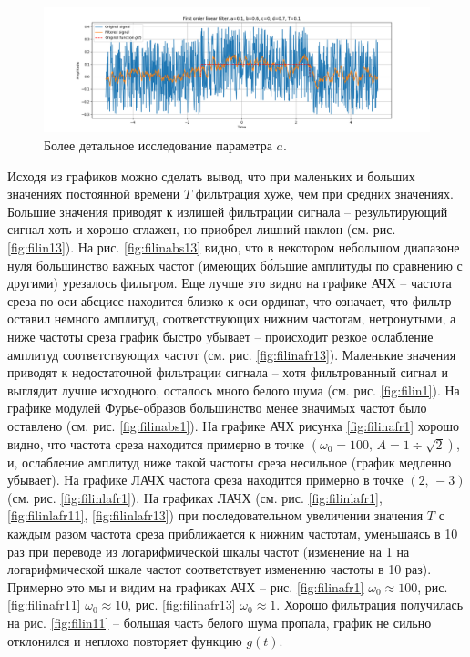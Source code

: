 \documentclass[a4paper, 12pt]{article}
\begin{document}
    \begin{figure}[H]
        \centering
        \includegraphics[scale=0.4]{alin4.png}
        \captionsetup{skip=0pt}
        \caption{Более детальное исследование параметра $a$.}
        \label{fig:alin4}
    \end{figure}


    Исходя из графиков можно сделать вывод, что при маленьких и больших значениях постоянной времени $T$ фильтрация хуже,
    чем при средних значениях. Большие значения приводят к излишей фильтрации сигнала -- результирующий сигнал хоть и хорошо
    сглажен, но приобрел лишний наклон (см. рис. \ref{fig:filin13}). На рис. \ref{fig:filinabs13} видно, что в некотором
    небольшом диапазоне нуля большинство важных частот (имеющих б\'{о}льшие амплитуды по сравнению с другими) урезалось
    фильтром. Еще лучше это видно на графике АЧХ -- частота среза по оси абсцисс находится близко к оси ординат, что означает,
    что фильтр оставил немного амплитуд, соответствующих нижним частотам, нетронутыми, а ниже частоты среза график быстро убывает
    -- происходит резкое ослабление амплитуд соответствующих частот (см. рис. \ref{fig:filinafr13}). Маленькие значения приводят к
    недостаточной фильтрации сигнала -- хотя фильтрованный сигнал и выглядит лучше исходного, осталось много белого шума
    (см. рис. \ref{fig:filin1}). На графике модулей Фурье-образов большинство менее значимых частот было оставлено
    (см. рис. \ref{fig:filinabs1}). На графике АЧХ рисунка \ref{fig:filinafr1} хорошо видно, что частота среза
    находится примерно в точке $\left(\omega_0=100,\,A=1\div\sqrt{2}\right)$, и, ослабление амплитуд ниже такой частоты среза несильное
    (график медленно убывает). На графике ЛАЧХ частота среза находится примерно в точке $\left(2,\,-3\right)$ (см. рис. \ref{fig:filinlafr1}).
    На графиках ЛАЧХ (см. рис. \ref{fig:filinlafr1}, \ref{fig:filinlafr11}, \ref{fig:filinlafr13})
    при последовательном увеличении значения $T$ с каждым разом частота среза приближается к нижним частотам, уменьшаясь в 10 раз при
    переводе из логарифмической шкалы частот (изменение на 1 на логарифмической шкале частот соответствует изменению частоты в 10 раз).
    Примерно это мы и видим на графиках АЧХ -- рис. \ref{fig:filinafr1} $\omega_0\approx 100$, рис. \ref{fig:filinafr11} $\omega_0\approx 10$,
    рис. \ref{fig:filinafr13} $\omega_0\approx 1$. Хорошо фильтрация получилась на рис. \ref{fig:filin11} -- большая часть белого шума пропала,
    график не сильно отклонился и неплохо повторяет функцию $g(t)$.
    
\end{document}
